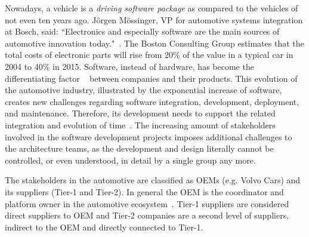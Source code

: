 Nowadays, a vehicle is a {\em driving software package} as compared to the vehicles of not even ten years ago. J\"orgen M\"ossinger, VP for automotive systems integration at Bosch, said: ``Electronics and especially software are the main sources of automotive innovation today."~\cite{Mossinger2010SoftwareAutomotive}. The Boston Consulting Group estimates that the total costs of electronic parts will rise from 20\% of the value in a typical car in 2004 to 40\% in 2015. Software, instead of hardware, has become the differentiating factor%
~\cite{ConnectedVehicle2012,hbr2015hardwaresoftware,Mossinger2010SoftwareAutomotive,Broy:2006:CAS:1134285.1134292} %
between companies and their products. This evolution of the automotive industry, illustrated by the exponential increase of software, creates new challenges regarding software integration, development, deployment, and maintenance. Therefore, its development needs to support the related integration and evolution of time~\cite{Broy:2006:CAS:1134285.1134292,qualman2009socialnomics,JansenTale2009}. The increasing amount of stakeholders involved in the software development projects imposes additional challenges to the architecture teams, as the development and design literally cannot be controlled, or even understood, in detail by a single group any more. 

The stakeholders in the automotive  are classified as OEMs (e.g. Volvo Cars) and its suppliers (Tier-1 and Tier-2). In general the OEM is the coordinator and platform owner in the automotive ecosystem~\cite{KS15}. Tier-1 suppliers are considered direct suppliers to OEM and Tier-2 companies are a second level of suppliers, indirect to the OEM and directly connected to Tier-1. %

